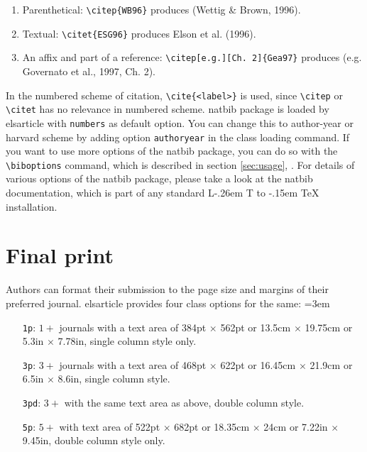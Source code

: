 \documentclass[a4paper,12pt]{article}
\makeatletter
\def\file#1{\textsf{#1}\xspace}
\DeclareRobustCommand{\LaTeX}{L\kern-.26em%
        {\sbox\z@ T%
         \vbox to\ht\z@{\hbox{\check@mathfonts
           \fontsize\sf@size\z@
           \math@fontsfalse\selectfont
          A\,}%
         \vss}%
        }%
     \kern-.15em%
    \TeX}
\makeatother
\begin{document}
\begin{enumerate}[\textbullet]
\item Parenthetical: \verb+\citep{WB96}+ produces (Wettig \&
  Brown, 1996).
\item Textual: \verb+\citet{ESG96}+ produces Elson et al. (1996).
\item An affix and part of a reference:
\verb+\citep[e.g.][Ch. 2]{Gea97}+ produces (e.g. Governato et
al., 1997, Ch. 2).
\end{enumerate}

In the numbered scheme of citation, \verb+\cite{<label>}+ is used,
since \verb+\citep+ or \verb+\citet+ has no relevance in numbered
scheme.  \file{natbib} package is loaded by \file{elsarticle} with
\verb+numbers+ as default option.  You can change this to author-year
or harvard scheme by adding option \verb+authoryear+ in the class
loading command.  If you want to use more options of the \file{natbib}
package, you can do so with the \verb+\biboptions+ command, which is
described in section \ref{sec:usage}, .  For
details of various options of the \file{natbib} package, please take a
look at the \file{natbib} documentation, which is part of any standard
\LaTeX{} installation.

\newpage

\section{Final print}\label{sec:final}
\hypertarget{final}{}

Authors can format their submission to the page size and margins
of their preferred journal.  \file{elsarticle} provides four
class options for the same:
\lmrgn=3em
\begin{enumerate}
\item [\texttt{1p}:] $1+$ journals with a text area of
384pt $\times$ 562pt or 13.5cm $\times$ 19.75cm or 5.3in $\times$
7.78in, single column style only.

\item [\texttt{3p}:] $3+$ journals with a text area of 468pt
$\times$ 622pt or 16.45cm $\times$ 21.9cm or 6.5in $\times$
8.6in, single column style.

\item [\texttt{3pd}:] $3+$ with the same text area as above,
double column style.

\item [\texttt{5p}:] $5+$ with text area of 522pt $\times$
682pt or 18.35cm $\times$ 24cm or 7.22in $\times$ 9.45in,
double column style only.
\end{enumerate}
\end{document}
